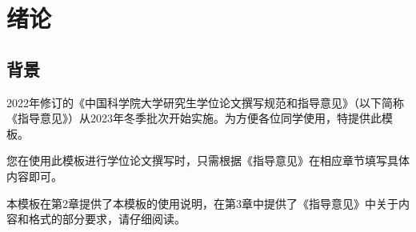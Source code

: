 \chapter{绪论}\label{chap:introduction}

\section{背景}

2022年修订的《中国科学院大学研究生学位论文撰写规范和指导意见》（以下简称《指导意见》）从2023年冬季批次开始实施。为方便各位同学使用，特提供此模板。

您在使用此模板进行学位论文撰写时，只需根据《指导意见》在相应章节填写具体内容即可。

本模板在第2章提供了本模板的使用说明，在第3章中提供了《指导意见》中关于内容和格式的部分要求，请仔细阅读。



